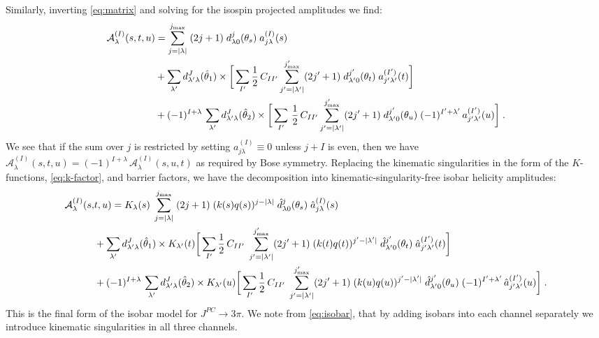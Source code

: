 Similarly, inverting \cref{eq:matrix} and solving for the isospin projected amplitudes we find:
  \begin{align}
    \mathcal{A}^{(I)}_\lambda(s,t,u) &=
    \sum_{j = |\lambda|}^{j_\text{max}} \; (2j + 1) \; d_{\lambda 0}^j(\theta_s) \; a_{j \lambda}^{(I)}(s) \nonumber \\
    &+ \sum_{\lambda^\prime} d_{{\lambda^\prime} \lambda}^J(\hat{\theta}_1) \times
    \bigg[
    \sum_{I^\prime} \frac{1}{2} \, C_{I{I^\prime}}
    \sum_{{j^\prime} =  |{\lambda^\prime}|}^{j^\prime_\text{max}} (2{j^\prime} + 1) \; d_{{\lambda^\prime} 0}^{j^\prime}(\theta_t) \; a_{{j^\prime} {\lambda^\prime}}^{({I^\prime})}(t)
    \bigg] \\
    &+ (-1)^{I + \lambda} \, \sum_{\lambda^\prime}  d_{{\lambda^\prime} \lambda}^J(\hat{\theta}_2) \times
    \bigg[
     \sum_{I^\prime} \, \frac{1}{2} \, C_{I{I^\prime}}
    \sum_{{j^\prime} = |{\lambda^\prime}|}^{j^\prime_\text{max}} (2{j^\prime} + 1) \;d_{{\lambda^\prime} 0}^{j^\prime}(\theta_u) \;  (-1)^{{I^\prime} + {\lambda^\prime}} \,  a_{{j^\prime} {\lambda^\prime}}^{({I^\prime})}(u)
    \bigg] \nonumber \; .
  \end{align}
We see that if the sum over \(j\) is restricted by setting \(a_{j\lambda}^{(I)} \equiv 0 \) unless \(j + I\) is even, then we have \(\mathcal{A}_\lambda^{(I)}(s,t,u) = (-1)^{I + \lambda} \, \mathcal{A}_\lambda^{(I)}(s,u,t)\) as required by Bose symmetry. Replacing the kinematic singularities in the form of the \(K\)-functions, \cref{eq:k-factor}, and barrier factors, we have the decomposition into kinematic-singularity-free isobar helicity amplitudes:
\begin{align}
  \label{eq:isobar}
    \mathcal{A}^{(I)}_\lambda(s,&t,u) =
    K_\lambda(s) \; \sum_{j = |\lambda|}^{j_\text{max}} \; (2j + 1) \; (k(s)q(s))^{j-|\lambda|} \; \hat{d}_{\lambda 0}^j(\theta_s) \; \hat{a}_{j \lambda}^{(I)}(s) \nonumber \\
    &+ \sum_{\lambda^\prime}  d_{{\lambda^\prime} \lambda}^J(\hat{\theta}_1) \times
    K_{\lambda^\prime}(t)
    \bigg[
    \sum_{I^\prime} \frac{1}{2} \, C_{I{I^\prime}} \;
    \sum_{{j^\prime} = |{\lambda^\prime}|}^{j^\prime_\text{max}} (2{j^\prime} + 1) \; (k(t)q(t))^{{j^\prime}-|{\lambda^\prime}|} \; \hat{d}_{{\lambda^\prime} 0}^{j^\prime}(\theta_t) \; \hat{a}_{{j^\prime}{\lambda^\prime}}^{({I^\prime})}(t)
    \bigg] \\
    &+ (-1)^{I + \lambda} \, \sum_{\lambda^\prime}  d_{{\lambda^\prime} \lambda}^J(\hat{\theta}_2) \times
    K_{\lambda^\prime}(u)
    \bigg[
    \sum_{I^\prime}  \frac{1}{2} \, C_{I{I^\prime}} \;
    \sum_{{j^\prime} =|{\lambda^\prime}|}^{j^\prime_\text{max}} (2{j^\prime} + 1) \;  (k(u)q(u))^{{j^\prime}-|{\lambda^\prime}|} \; \hat{d}_{{\lambda^\prime} 0}^{j^\prime}(\theta_u)
    \;  (-1)^{{I^\prime} + {\lambda^\prime}} \,\hat{a}_{{j^\prime}{\lambda^\prime}}^{({I^\prime})}(u)
    \bigg] \nonumber \; .
  \end{align}
This is the final form of the isobar model for \(J^{PC} \to 3\pi\). We note from \cref{eq:isobar}, that by adding isobars into each channel separately we introduce kinematic singularities in all three channels.
